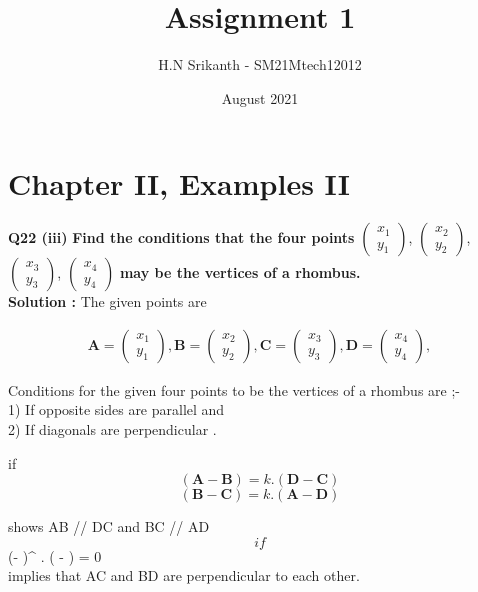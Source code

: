 \documentclass{article}
\title{\textbf{\Huge Assignment 1}}
\author{\large H.N Srikanth - SM21Mtech12012}
\date{August 2021}
\begin{document}
\providecommand{\mbf}{\mathbf}


\newcommand{\myvec}[1]{\ensuremath{\begin{pmatrix}#1\end{pmatrix}}}
\let\vec\mathbf


\maketitle

\section*{Chapter II, Examples II}
\textbf{Q22 (iii)}
\textbf{Find the conditions that the four points}
\myvec{x_1\\y_1}, \myvec{x_2\\y_2},
\myvec{x_3\\y_3}, \myvec{x_4\\y_4}
\textbf{ may be the vertices of a rhombus.}\\

\textbf{Solution :}
\vspace{0.2cm}
 The given points are


\begin{align*}
\vec{A} = \myvec{x_1\\y_1}, \vec{B} =\myvec{x_2\\y_2},
\vec{C} =\myvec{x_3\\y_3}, \vec{D} =\myvec{x_4\\y_4},
\end{align*}


Conditions for the given four points to be the vertices of a rhombus are ;-\\
1) If opposite sides are parallel and\\
2) If diagonals are perpendicular .

\vspace{0.2cm}


if $$(\vec{A}-\vec{B} ) = k.(\vec{D}-\vec{C} )$$
 $$(\vec{B}-\vec{C} )=k.(\vec{A}-\vec{D} )$$

 \vspace{0.2cm}
 shows AB // DC and BC // AD $$



if $$(\vec{A}-\vec{C} )^ \top. ( \vec{B}-\vec{D} ) = 0 $$\\
implies that AC and BD are perpendicular to each other.\\ 
\end{document}
